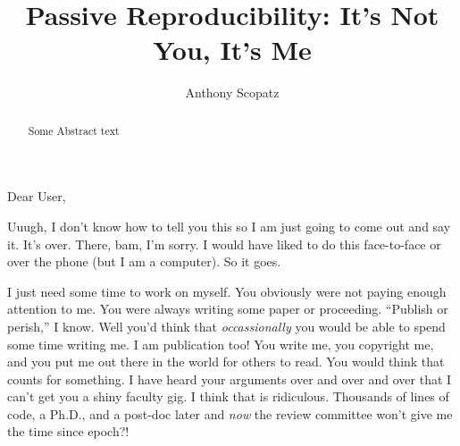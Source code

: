 \documentclass[final,10pt]{elsarticle}
\makeatletter
\newcommand{\emaila}{scopatz@flash.uchicago.edu}
\makeatother
\begin{document}
\begin{frontmatter}



\title{Passive Reproducibility: It's Not You, It's Me}




\author[fc]{Anthony Scopatz} 

\address[fc]{Flash Center for Computational Science, University of Chicago}


\begin{abstract}
Some Abstract text
\end{abstract}


\end{frontmatter}

Dear User, 

Uuugh, I don't know how to tell you this so I am just going to come out and
say it.  It's over.  There, bam, I'm sorry.  I would have liked to do this 
face-to-face or over the phone (but I am a computer).  So it goes.

I just need some time to work on myself.  You obviously were not paying enough 
attention to me.  You were always writing some paper or proceeding.  ``Publish or 
perish,'' I know.  Well you'd think that \emph{occassionally} you would be able 
to spend some time writing me.  I am publication too!  You write me, you copyright
me, and you put me out there in the world for others to read.  You would think that 
counts for something.  I have heard your arguments over and over and over that I 
can't get you a shiny faculty gig.  I think that is ridiculous.  Thousands of 
lines of code, a Ph.D., and a post-doc later and \emph{now} the review committee 
won't give me the time since epoch?!
\end{document}
